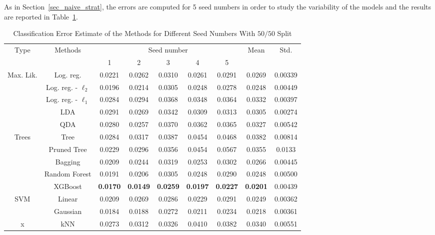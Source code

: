 As in Section~\ref{sec_naive_strat}, the errors are computed for \num{5} seed numbers in order to study the variability of the models and the results are reported in Table~\ref{tab_res_our_strategy}.

\begin{table}[htb]
	\caption{Classification Error Estimate of the Methods for Different Seed Numbers With $50/50$ Split}
	\begin{center}
		\begin{tabular}{@{} c c c  c c c c c c@{}}\toprule
			\multirow{2}{*}{Type} & \multirow{2}{*}{Methods} &  \multicolumn{5}{c}{Seed number}
			& 	\multirow{2}{*}{Mean} & \multirow{2}{*}{Std.} \\
			& & 1 & 2 & 3 & 4 & 5 & & \\
			\midrule
			\multirow{5}{*}{Max. Lik.} & Log. reg. & \num{0.0221} & \num{0.0262} & \num{0.0310} & \num{0.0261} & \num{0.0291} & \num{0.0269} & \num{0.00339} \\
			& Log. reg. - $\ell_2$ & \num{0.0196} & \num{0.0214} & \num{0.0305} & \num{0.0248} & \num{0.0278} & \num{0.0248} & \num{0.00449}\\
			& Log. reg. - $\ell_1$ & \num{0.0284} & \num{0.0294} & \num{0.0368} & \num{0.0348} & \num{0.0364} & \num{0.0332} & \num{0.00397}\\
			& LDA & \num{0.0291} & \num{0.0269} & \num{0.0342} & \num{0.0309} & \num{0.0313} & \num{0.0305} & \num{0.00274}\\
			& QDA & \num{0.0280} & \num{0.0257} & \num{0.0370} & \num{0.0362} & \num{0.0365} & \num{0.0327} & \num{0.00542}\\
			\cmidrule{1-9}
			\multirow{5}{*}{Trees} & Tree & \num{0.0284} & \num{0.0317} & \num{0.0387} & \num{0.0454} & \num{0.0468} & \num{0.0382} & \num{0.00814}\\
			& Pruned Tree & \num{0.0229} & \num{0.0296} & \num{0.0356} & \num{0.0454} & \num{0.0567} & \num{0.0355} & \num{0.0133}\\  
			& Bagging & \num{0.0209} & \num{0.0244} & \num{0.0319} & \num{0.0253} & \num{0.0302} & \num{0.0266} & \num{0.00445}\\
			& Random Forest & \num{0.0191} & \num{0.0206} & \num{0.0305} & \num{0.0248} & \num{0.0290} & \num{0.0248} & \num{0.00500}\\
			& XGBoost & \textbf{\num{0.0170}} & \textbf{\num{0.0149}} & \textbf{\num{0.0259}} & \textbf{\num{0.0197}} & \textbf{\num{0.0227}} & \textbf{\num{0.0201}} & \num{0.00439}\\
			\cmidrule{1-9}
			\multirow{2}{*}{SVM} & Linear & \num{0.0209} & \num{0.0269} & \num{0.0286} & \num{0.0229} & \num{0.0291} & \num{0.0249} & \num{0.00362}\\
			& Gaussian & \num{0.0184} & \num{0.0188} & \num{0.0272} & \num{0.0211} & \num{0.0234} & \num{0.0218} & \num{0.00361}\\
			\cmidrule{1-9}
			x & kNN & \num{0.0273} & \num{0.0312} & \num{0.0326} & \num{0.0410} & \num{0.0382} & \num{0.0340} & \num{0.00551} \\
			\bottomrule
		\end{tabular}
	\end{center}
	\label{tab_res_our_strategy}
\end{table}
